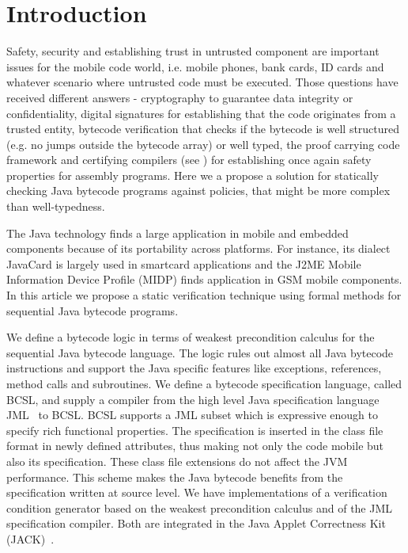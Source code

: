 
\section{Introduction}\label{intro}
Safety, security and establishing trust in untrusted component are important issues for the mobile code world, 
i.e. mobile phones, bank cards, ID cards and whatever scenario where 
untrusted code must be executed. Those questions have received different answers - cryptography to guarantee data integrity or confidentiality,
 digital signatures for establishing that the code originates from a trusted entity, bytecode verification that checks if the bytecode 
 is well structured (e.g. no jumps outside the bytecode array) or well typed, the proof carrying code framework and certifying compilers (see \cite{ComNec,DesNecLee98}) for establishing once again safety properties for assembly programs.  Here we a propose a solution for statically checking Java bytecode programs against
 policies, that might be more complex than well-typedness.



The Java technology finds a large application in mobile and embedded components because of its portability across platforms. 
For instance, its dialect JavaCard is largely used in smartcard applications and the J2ME Mobile Information Device Profile (MIDP) finds application in GSM mobile components. 
In this article we propose a static verification technique using formal methods for sequential Java bytecode programs.

We define a bytecode logic in terms of weakest precondition calculus for the sequential Java bytecode language. The logic rules out 
almost all Java bytecode instructions and support the Java specific features like 
exceptions, references, method calls and subroutines.  
 We define a bytecode specification language, called BCSL, and supply a compiler from 
 the high level Java specification language JML~\cite{JMLRefMan} to BCSL. 
 BCSL supports a JML subset which is expressive enough to specify rich functional properties. The specification is 
 inserted in the class file format in newly defined attributes, thus making not only the code mobile but also its specification. These class
 file extensions do not affect the JVM performance. This scheme makes the Java bytecode benefits from the specification written at source level.
 We have implementations of a verification condition generator based on the weakest precondition calculus and of the JML specification compiler. Both are integrated in the Java Applet Correctness Kit (JACK)~\cite{BRL-JACK}. 

